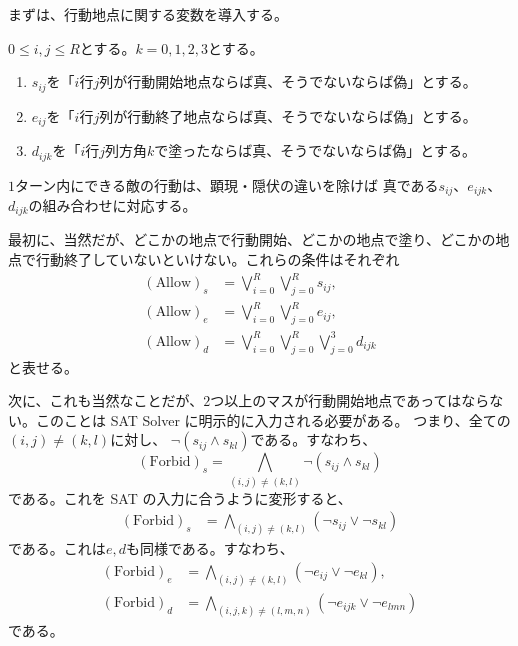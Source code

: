 まずは、行動地点に関する変数を導入する。

\begin{nota}
 $0 \leq i, j \leq R$とする。$k = 0, 1, 2 ,3$とする。
 \begin{enumerate}[1.]
  \item $s_{ij}$を「$i$行$j$列が行動開始地点ならば真、そうでないならば偽」とする。
  \item $e_{ij}$を「$i$行$j$列が行動終了地点ならば真、そうでないならば偽」とする。
  \item $d_{ijk}$を「$i$行$j$列方角$k$で塗ったならば真、そうでないならば偽」とする。
 \end{enumerate}
\end{nota}

\begin{rem} \label{rem:kumiawase}
 $1$ターン内にできる敵の行動は、顕現・隠伏の違いを除けば
 真である$s_{ij}$、$e_{ijk}$、$d_{ijk}$の組み合わせに対応する。
\end{rem}

最初に、当然だが、どこかの地点で行動開始、どこかの地点で塗り、どこかの地
点で行動終了していないといけない。これらの条件はそれぞれ
\begin{align*}
 (\text{Allow})_s &= \bigvee_{i = 0}^R \bigvee_{j = 0}^R s_{ij}, \\
 (\text{Allow})_e &= \bigvee_{i = 0}^R \bigvee_{j = 0}^R e_{ij}, \\
 (\text{Allow})_d &=
 \bigvee_{i = 0}^R \bigvee_{j = 0}^R \bigvee_{j = 0}^3 d_{ijk}
\end{align*}
と表せる。

次に、これも当然なことだが、$2$つ以上のマスが行動開始地点であってはならな
い。このことは SAT Solver に明示的に入力される必要がある。
つまり、全ての$(i, j) \neq (k, l)$に対し、
$\lnot (s_{ij} \land s_{kl})$である。すなわち、
\[
 (\text{Forbid})_s = 
 \bigwedge_{(i, j) \neq (k, l)} \lnot
 (s_{ij} \land s_{kl})
\]
である。これを SAT の入力に合うように変形すると、
\begin{align*}
 (\text{Forbid})_s &= \bigwedge_{(i, j) \neq (k, l)} (\lnot
 s_{ij} \lor \lnot s_{kl}) 
\end{align*}
である。これは$e, d$も同様である。すなわち、
\begin{align*}
 (\text{Forbid})_e &= \bigwedge_{(i, j) \neq (k, l)} (\lnot
 e_{ij} \lor \lnot e_{kl}), \\
 (\text{Forbid})_d &= \bigwedge_{(i, j, k) \neq (l, m, n)} (\lnot
 e_{ijk} \lor \lnot e_{lmn})
\end{align*}
である。

